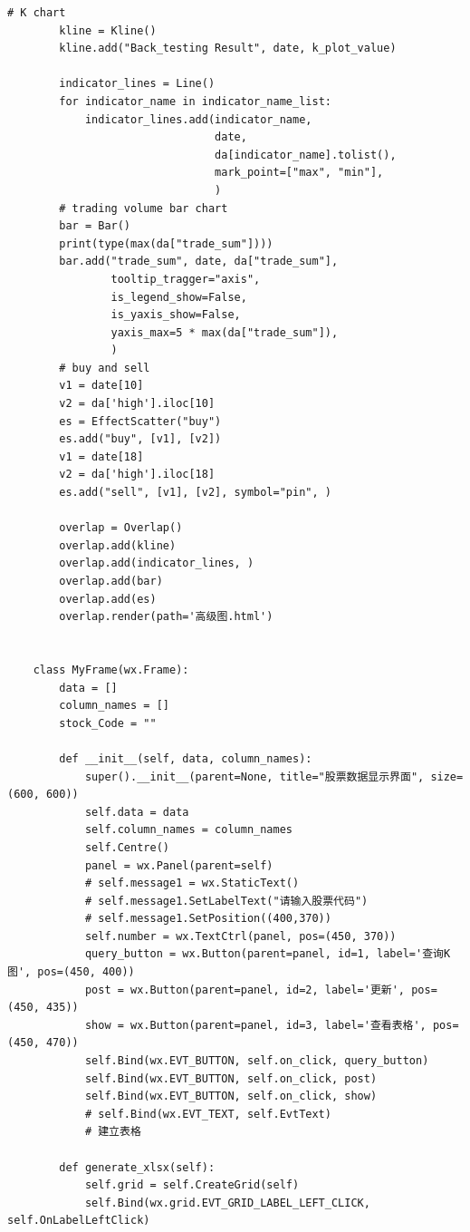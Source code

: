 \documentclass[UTF8,12pt]{article}
\begin{document}
\begin{lstlisting}[title=实验源码,frame=shadowbox]
        # K chart
        kline = Kline()
        kline.add("Back_testing Result", date, k_plot_value)
    
        indicator_lines = Line()
        for indicator_name in indicator_name_list:
            indicator_lines.add(indicator_name,
                                date,
                                da[indicator_name].tolist(),
                                mark_point=["max", "min"],
                                )
        # trading volume bar chart
        bar = Bar()
        print(type(max(da["trade_sum"])))
        bar.add("trade_sum", date, da["trade_sum"],
                tooltip_tragger="axis",
                is_legend_show=False,
                is_yaxis_show=False,
                yaxis_max=5 * max(da["trade_sum"]),
                )
        # buy and sell
        v1 = date[10]
        v2 = da['high'].iloc[10]
        es = EffectScatter("buy")
        es.add("buy", [v1], [v2])
        v1 = date[18]
        v2 = da['high'].iloc[18]
        es.add("sell", [v1], [v2], symbol="pin", )
    
        overlap = Overlap()
        overlap.add(kline)
        overlap.add(indicator_lines, )
        overlap.add(bar)
        overlap.add(es)
        overlap.render(path='高级图.html')
    
    
    class MyFrame(wx.Frame):
        data = []
        column_names = []
        stock_Code = ""
    
        def __init__(self, data, column_names):
            super().__init__(parent=None, title="股票数据显示界面", size=(600, 600))
            self.data = data
            self.column_names = column_names
            self.Centre()
            panel = wx.Panel(parent=self)
            # self.message1 = wx.StaticText()
            # self.message1.SetLabelText("请输入股票代码")
            # self.message1.SetPosition((400,370))
            self.number = wx.TextCtrl(panel, pos=(450, 370))
            query_button = wx.Button(parent=panel, id=1, label='查询K图', pos=(450, 400))
            post = wx.Button(parent=panel, id=2, label='更新', pos=(450, 435))
            show = wx.Button(parent=panel, id=3, label='查看表格', pos=(450, 470))
            self.Bind(wx.EVT_BUTTON, self.on_click, query_button)
            self.Bind(wx.EVT_BUTTON, self.on_click, post)
            self.Bind(wx.EVT_BUTTON, self.on_click, show)
            # self.Bind(wx.EVT_TEXT, self.EvtText)
            # 建立表格
    
        def generate_xlsx(self):
            self.grid = self.CreateGrid(self)
            self.Bind(wx.grid.EVT_GRID_LABEL_LEFT_CLICK, self.OnLabelLeftClick)
    

\end{lstlisting}
\end{document}
